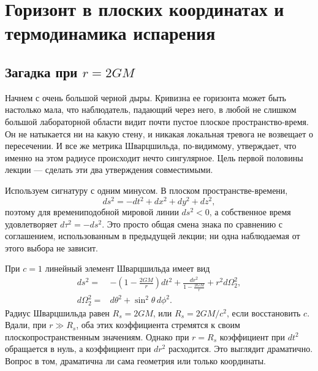 \chapter{Горизонт в плоских координатах и термодинамика испарения}


\section{Загадка при \texorpdfstring{\(r=2GM\)}{r=2GM}}

Начнем с очень большой черной дыры. Кривизна ее горизонта может быть настолько мала, что наблюдатель, падающий через него, в любой не слишком большой лабораторной области видит почти пустое плоское пространство-время. Он не натыкается ни на какую стену, и никакая локальная тревога не возвещает о пересечении. И все же метрика Шварцшильда, по-видимому, утверждает, что именно на этом радиусе происходит нечто сингулярное. Цель первой половины лекции — сделать эти два утверждения совместимыми.

Используем сигнатуру с одним минусом. В плоском пространстве-времени,
\begin{equation}
ds^2=-dt^2+dx^2+dy^2+dz^2,
\end{equation}
поэтому для времениподобной мировой линии \(ds^2<0\), а собственное время удовлетворяет \(d\tau^2=-ds^2\). Это просто общая смена знака по сравнению с соглашением, использованным в предыдущей лекции; ни одна наблюдаемая от этого выбора не зависит.

При \(c=1\) линейный элемент Шварцшильда имеет вид
\begin{equation}
\begin{aligned}
ds^2={}&-\left(1-\frac{2GM}{r}\right)dt^2
+\frac{dr^2}{1-\frac{2GM}{r}}
+r^2d\Omega_2^2,\\
d\Omega_2^2={}&d\theta^2+\sin^2\theta\,d\phi^2 .
\end{aligned}
\label{eq:l03-schwarzschild}
\end{equation}
Радиус Шварцшильда равен \(R_s=2GM\), или \(R_s=2GM/c^2\), если восстановить \(c\). Вдали, при \(r\gg R_s\), оба этих коэффициента стремятся к своим плоскопространственным значениям. Однако при \(r=R_s\) коэффициент при \(dt^2\) обращается в нуль, а коэффициент при \(dr^2\) расходится. Это выглядит драматично. Вопрос в том, драматична ли сама геометрия или только координаты.

